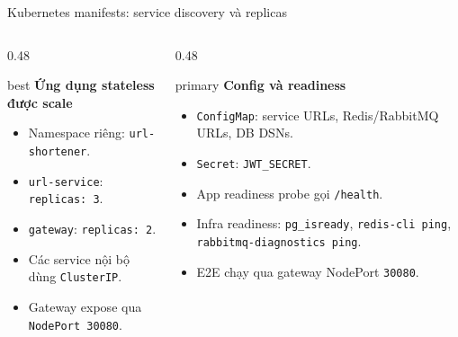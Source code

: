 \documentclass[aspectratio=169]{beamer}
\begin{document}
\begin{frame}{Kubernetes manifests: service discovery và replicas}
    \begin{columns}[T,onlytextwidth]
        \begin{column}{0.48\textwidth}
            \begin{claimbox}{best}
                \textbf{Ứng dụng stateless được scale}
                \begin{itemize}\small
                    \item Namespace riêng: \texttt{url-shortener}.
                    \item \texttt{url-service}: \texttt{replicas: 3}.
                    \item \texttt{gateway}: \texttt{replicas: 2}.
                    \item Các service nội bộ dùng \texttt{ClusterIP}.
                    \item Gateway expose qua \texttt{NodePort 30080}.
                \end{itemize}
            \end{claimbox}
        \end{column}
        \begin{column}{0.48\textwidth}
            \begin{claimbox}{primary}
                \textbf{Config và readiness}
                \begin{itemize}\small
                    \item \texttt{ConfigMap}: service URLs, Redis/RabbitMQ URLs, DB DSNs.
                    \item \texttt{Secret}: \texttt{JWT\_SECRET}.
                    \item App readiness probe gọi \texttt{/health}.
                    \item Infra readiness: \texttt{pg\_isready}, \texttt{redis-cli ping}, \texttt{rabbitmq-diagnostics ping}.
                    \item E2E chạy qua gateway NodePort \texttt{30080}.
                \end{itemize}
            \end{claimbox}
        \end{column}
    \end{columns}
\end{frame}
\end{document}
